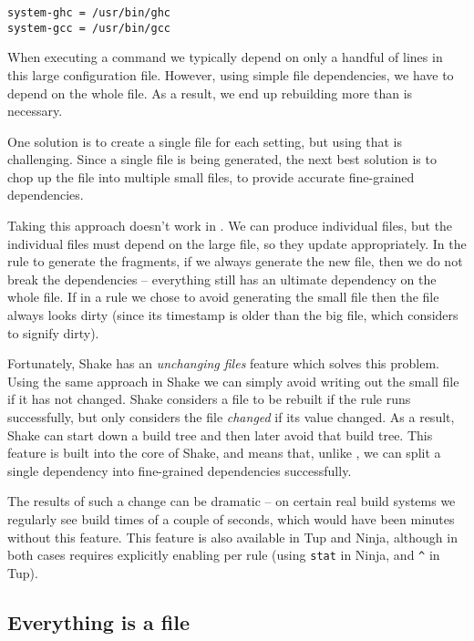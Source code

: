
\begin{lstlisting}
system-ghc = /usr/bin/ghc
system-gcc = /usr/bin/gcc
\end{lstlisting}

When executing a command we typically depend on only a handful of lines in this large configuration file. However, using simple file dependencies, we have to depend on the whole file. As a result, we end up rebuilding more than is necessary.

One solution is to create a single file for each setting, but using  that is challenging. Since a single file is being generated, the next best solution is to chop up the file into multiple small files, to provide accurate fine-grained dependencies.

Taking this approach doesn't work in \make{}. We can produce individual files, but the individual files must depend on the large file, so they update appropriately. In the rule to generate the fragments, if we always generate the new file, then we do not break the dependencies -- everything still has an ultimate dependency on the whole file. If in a rule we chose to avoid generating the small file then the file always looks dirty (since its timestamp is older than the big file, which \make{} considers to signify dirty).

Fortunately, Shake has an \emph{unchanging files} feature which solves this problem. Using the same approach in Shake we can simply avoid writing out the small file if it has not changed. Shake considers a file to be rebuilt if the rule runs successfully, but only considers the file \emph{changed} if its value changed. As a result, Shake can start down a build tree and then later avoid that build tree. This feature is built into the core of Shake, and means that, unlike \make{}, we can split a single dependency into fine-grained dependencies successfully.

The results of such a change can be dramatic -- on certain real build systems we regularly see build times of a couple of seconds, which would have been minutes without this feature. This feature is also available in Tup and Ninja, although in both cases requires explicitly enabling per rule (using \texttt{stat} in Ninja, and \texttt{\^} in Tup).

\subsection{Everything is a file}

